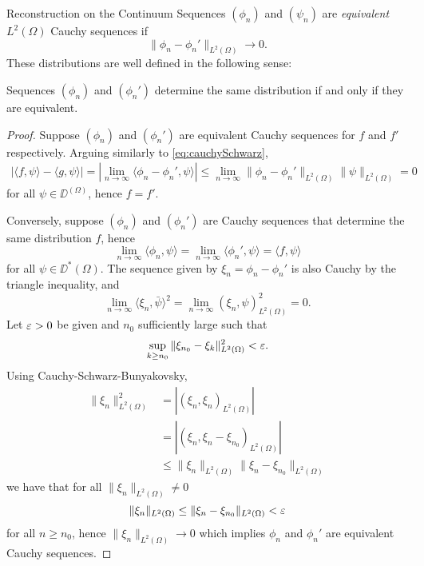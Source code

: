 \begin{chapter}{Reconstruction on the Continuum}
Sequences $(\phi_n)$ and $(\psi_n)$ are \emph{equivalent} $L^2(\Omega)$ Cauchy sequences if
\begin{equation}\label{eq:cauchyEquivalence}
  \|\phi_n - \phi_n'\|_{L^2(\Omega)} \to 0.
\end{equation}
These distributions are well defined in the following sense: 
\begin{prop} \label{prop:cauchyCorrespondence}
  Sequences $(\phi_n)$ and $(\phi_n')$ determine the same distribution if and only if they are equivalent.
\end{prop}
\begin{proof}
  Suppose $(\phi_n)$ and $(\phi_n')$ are equivalent Cauchy sequences for $f$ and $f'$ respectively.
  Arguing similarly to \eqref{eq:cauchySchwarz},
  \begin{align} 
    |\langle f, \psi\rangle - \langle g, \psi\rangle| = \left|\lim_{n\to \infty}\langle \phi_n - \phi_n', \psi\rangle\right| \le \lim_{n\to\infty}\|\phi_n - \phi_n'\|_{L^2(\Omega)}\|\psi\|_{L^2(\Omega)} =  0
  \end{align} 
  for all $\psi \in \DD^(\Omega)$, hence $f = f'$.

  Conversely, suppose $(\phi_n)$ and $(\phi_n')$ are Cauchy sequences that determine the same distribution $f$, hence
  \begin{equation}
    \lim_{n\to\infty} \langle \phi_n,\psi\rangle = \lim_{n\to\infty} \langle \phi_n',\psi\rangle = \langle f,\psi\rangle
  \end{equation}
  for all $\psi \in \DD^*(\Omega)$.
  The sequence given by $\xi_n = \phi_n - \phi_n'$ is also Cauchy by the triangle inequality, and 
  \begin{equation}
    \lim_{n\to\infty}\langle \xi_n,\bar{\psi}\rangle^2 = \lim_{n\to\infty} (\xi_n,\psi)_{L^2(\Omega)}^2 = 0.
  \end{equation}
  Let $\varepsilon >0$ be given and $n_0$ sufficiently large such that 
  \begin{equation}
    \sup_{k\ge n_0} \|\xi_{n_0} - \xi_k\|_{L^2(\Omega)}^2 < \varepsilon.
  \end{equation}
  Using Cauchy-Schwarz-Bunyakovsky,
  \begin{align}
    \|\xi_n\|_{L^2(\Omega)}^2 
      &= |(\xi_n,\xi_n)_{L^2(\Omega)}| \nonumber\\
      &= |(\xi_n,\xi_n - \xi_{n_0})_{L^2(\Omega)}| \nonumber\\
      &\le \|\xi_n\|_{L^2(\Omega)}\|\xi_n-\xi_{n_0}\|_{L^2(\Omega)}
  \end{align}
  we have that for all $\|\xi_n\|_{L^2(\Omega)} \not= 0$
  \begin{equation}
    \|\xi_n\|_{L^2(\Omega)} \le \|\xi_n - \xi_{n_0}\|_{L^2(\Omega)} < \varepsilon
  \end{equation}
  for all $n \ge n_0$, hence $\|\xi_n\|_{L^2(\Omega)} \to 0$ which implies $\phi_n$ and $\phi_n'$ are equivalent Cauchy sequences.
\end{proof}


\end{chapter}
